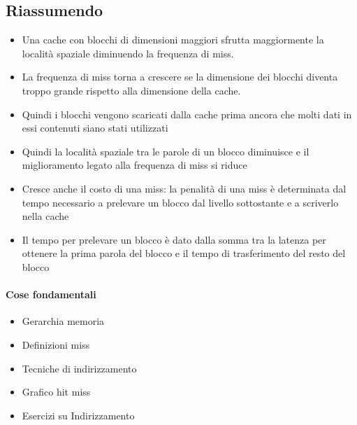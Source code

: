 \documentclass[12pt, a4paper, openany]{book}
\begin{document}
\subsection{Riassumendo}
\begin{itemize}
    \item Una cache con blocchi di dimensioni maggiori sfrutta maggiormente la località
    spaziale diminuendo la frequenza di miss.
    \item La frequenza di miss torna a crescere se la dimensione dei blocchi diventa troppo
    grande rispetto alla dimensione della cache.
    \item Quindi i blocchi vengono scaricati dalla cache prima ancora che molti dati
    in essi contenuti siano stati utilizzati
    \item Quindi la località spaziale tra le parole di un blocco diminuisce e il
    miglioramento legato alla frequenza di miss si riduce
    \item Cresce anche il costo di una miss: la penalità di una miss è determinata
    dal tempo necessario a prelevare un blocco dal livello sottostante e a scriverlo nella cache
    \item Il tempo per prelevare un blocco è dato dalla somma tra la latenza per ottenere
    la prima parola del blocco e il tempo di trasferimento del resto del blocco
\end{itemize}

\paragraph*{Cose fondamentali}
\begin{itemize}
    \item Gerarchia memoria
    \item Definizioni miss
    \item Tecniche di indirizzamento
    \item Grafico hit miss
    \item Esercizi su Indirizzamento
\end{itemize}
\end{document}
